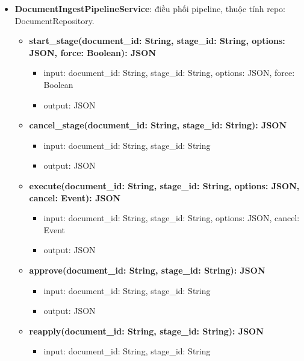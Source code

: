 \begin{itemize}[label=\textbullet, itemsep=0.4em]
\begin{itemize}[label=$\circ$, itemsep=0.2em, leftmargin=1.5em]
\begin{itemize}[label=$\blacksquare$, itemsep=0.1em, leftmargin=1.5em]
    \end{itemize}
  \end{itemize}
  \item \textbf{DocumentIngestPipelineService}: điều phối pipeline, thuộc tính repo: DocumentRepository.
  \begin{itemize}[label=$\circ$, itemsep=0.2em, leftmargin=1.5em]
    \item \textbf{start\_stage(document\_id: String, stage\_id: String, options: JSON, force: Boolean): JSON}
    \begin{itemize}[label=$\blacksquare$, itemsep=0.1em, leftmargin=1.5em]
      \item input: document\_id: String, stage\_id: String, options: JSON, force: Boolean
      \item output: JSON
    \end{itemize}
    \item \textbf{cancel\_stage(document\_id: String, stage\_id: String): JSON}
    \begin{itemize}[label=$\blacksquare$, itemsep=0.1em, leftmargin=1.5em]
      \item input: document\_id: String, stage\_id: String
      \item output: JSON
    \end{itemize}
    \item \textbf{execute(document\_id: String, stage\_id: String, options: JSON, cancel: Event): JSON}
    \begin{itemize}[label=$\blacksquare$, itemsep=0.1em, leftmargin=1.5em]
      \item input: document\_id: String, stage\_id: String, options: JSON, cancel: Event
      \item output: JSON
    \end{itemize}
    \item \textbf{approve(document\_id: String, stage\_id: String): JSON}
    \begin{itemize}[label=$\blacksquare$, itemsep=0.1em, leftmargin=1.5em]
      \item input: document\_id: String, stage\_id: String
      \item output: JSON
    \end{itemize}
    \item \textbf{reapply(document\_id: String, stage\_id: String): JSON}
    \begin{itemize}[label=$\blacksquare$, itemsep=0.1em, leftmargin=1.5em]
      \item input: document\_id: String, stage\_id: String

\end{itemize}
\end{itemize}
\end{itemize}
